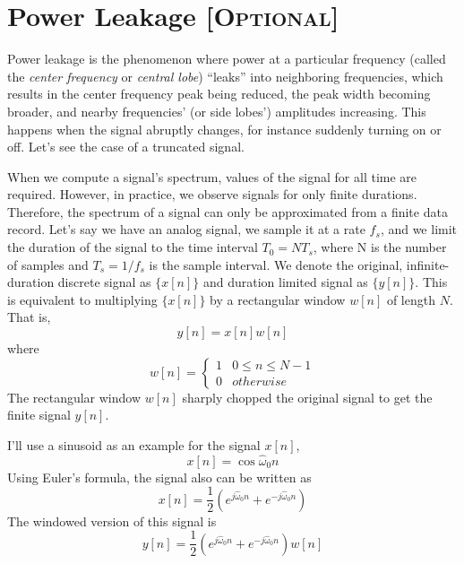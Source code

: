 \section{Power Leakage [\textsc{Optional}]}

Power leakage is the phenomenon where power at a particular frequency
(called the \emph{center frequency} or \emph{central lobe}) ``leaks''
into neighboring frequencies, which results in the center frequency
peak being reduced, the peak width becoming broader, and nearby
frequencies' (or side lobes') amplitudes increasing. This happens when
the signal abruptly changes, for instance suddenly turning on or
off. Let's see the case of a truncated signal.

When we compute a signal's spectrum, values of the signal for all time
are required. However, in practice, we observe signals for only finite
durations. Therefore, the spectrum of a signal can only be
approximated from a finite data record. Let's say we have an analog
signal, we sample it at a rate $f_s$, and we limit the duration of the
signal to the time interval $T_0 = NT_s$, where N is the number of
samples and $T_s=1/f_s$ is the sample interval. We denote the original,
infinite-duration discrete signal as $\{x[n]\}$ and duration limited
signal as $\{y[n]\}$. This is equivalent to multiplying $\{x[n]\}$ by a
rectangular window $w[n]$ of length $N$. That is,
\begin{equation}
y[n] = x[n] w[n]
\end{equation}
where 
\begin{equation}
w[n] = \left\{\begin{array}{ll}
                        1 & 0 \le n \le N-1\\
                        0 & otherwise
          \end{array}\right.
\end{equation}
The rectangular window $w[n]$ sharply chopped the original signal to
get the finite signal $y[n]$.

I'll use a sinusoid as an example for the signal $x[n]$,
\begin{equation}
x[n] = \cos \hat{\omega}_0 n
\end{equation}
Using Euler's formula, the signal also can be written as
\begin{equation}
x[n] = \frac{1}{2}\left(e^{j\hat{\omega}_0 n} + e^{-j\hat{\omega}_0 n}\right)
\end{equation}
The windowed version of this signal is 
\begin{equation}
y[n] = \frac{1}{2}\left(e^{j\hat{\omega}_0 n}
       + e^{-j\hat{\omega}_0 n}\right)w[n]
\end{equation}

